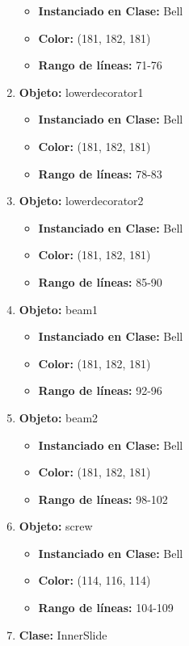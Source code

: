 \documentclass[10pt, a4paper]{article}
\begin{document}
\begin{enumerate}
	\begin{itemize}
		\item \textbf{Instanciado en Clase:} Bell
		\item \textbf{Color:} (181, 182, 181)
		\item \textbf{Rango de líneas:} 71-76
	\end{itemize}
	\item \textbf{Objeto:} lowerdecorator1 
	\begin{itemize}
		\item \textbf{Instanciado en Clase:} Bell
		\item \textbf{Color:} (181, 182, 181)
		\item \textbf{Rango de líneas:} 78-83
	\end{itemize}
	\item \textbf{Objeto:} lowerdecorator2
	\begin{itemize}
		\item \textbf{Instanciado en Clase:} Bell
		\item \textbf{Color:} (181, 182, 181)
		\item \textbf{Rango de líneas:} 85-90
	\end{itemize}
	\item \textbf{Objeto:} beam1 
	\begin{itemize}
		\item \textbf{Instanciado en Clase:} Bell
		\item \textbf{Color:} (181, 182, 181)
		\item \textbf{Rango de líneas:} 92-96
	\end{itemize}
	\item \textbf{Objeto:} beam2
	\begin{itemize}
		\item \textbf{Instanciado en Clase:} Bell
		\item \textbf{Color:} (181, 182, 181)
		\item \textbf{Rango de líneas:} 98-102
	\end{itemize}
	\item \textbf{Objeto:} screw
	\begin{itemize}
		\item \textbf{Instanciado en Clase:} Bell
		\item \textbf{Color:} (114, 116, 114)
		\item \textbf{Rango de líneas:} 104-109
	\end{itemize}
	\item \textbf{Clase:} InnerSlide
	\begin{itemize}

\end{itemize}
\end{enumerate}
\end{document}
